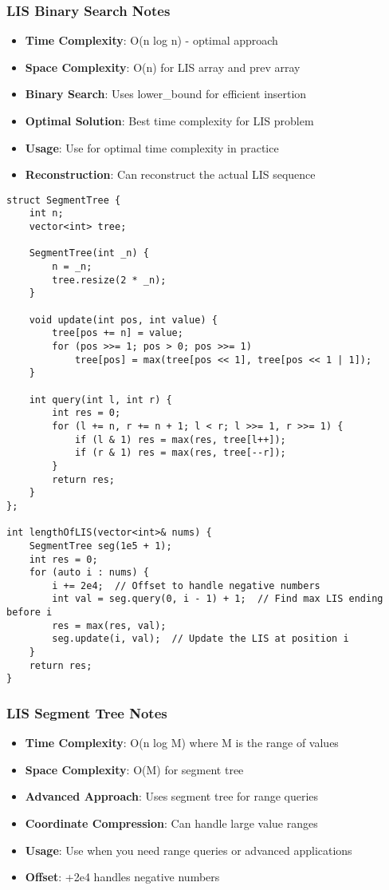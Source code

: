 \documentclass[11pt,a4paper]{article}
\begin{document}
\subsubsection{LIS Binary Search Notes}
\begin{itemize}
\item \textbf{Time Complexity}: O(n log n) - optimal approach
\item \textbf{Space Complexity}: O(n) for LIS array and prev array
\item \textbf{Binary Search}: Uses lower\_bound for efficient insertion
\item \textbf{Optimal Solution}: Best time complexity for LIS problem
\item \textbf{Usage}: Use for optimal time complexity in practice
\item \textbf{Reconstruction}: Can reconstruct the actual LIS sequence
\end{itemize}

\newpage
\begin{lstlisting}[caption={LIS - Segment Tree Implementation}]
struct SegmentTree {
    int n;
    vector<int> tree;
    
    SegmentTree(int _n) {
        n = _n;
        tree.resize(2 * _n);
    }

    void update(int pos, int value) {
        tree[pos += n] = value;
        for (pos >>= 1; pos > 0; pos >>= 1) 
            tree[pos] = max(tree[pos << 1], tree[pos << 1 | 1]);
    }

    int query(int l, int r) {
        int res = 0;
        for (l += n, r += n + 1; l < r; l >>= 1, r >>= 1) {
            if (l & 1) res = max(res, tree[l++]);
            if (r & 1) res = max(res, tree[--r]);
        }
        return res;
    }
};

int lengthOfLIS(vector<int>& nums) {
    SegmentTree seg(1e5 + 1);
    int res = 0;
    for (auto i : nums) {
        i += 2e4;  // Offset to handle negative numbers
        int val = seg.query(0, i - 1) + 1;  // Find max LIS ending before i
        res = max(res, val);
        seg.update(i, val);  // Update the LIS at position i
    }
    return res;
}
\end{lstlisting}

\subsubsection{LIS Segment Tree Notes}
\begin{itemize}
\item \textbf{Time Complexity}: O(n log M) where M is the range of values
\item \textbf{Space Complexity}: O(M) for segment tree
\item \textbf{Advanced Approach}: Uses segment tree for range queries
\item \textbf{Coordinate Compression}: Can handle large value ranges
\item \textbf{Usage}: Use when you need range queries or advanced applications
\item \textbf{Offset}: +2e4 handles negative numbers
\end{itemize}
\end{document}
